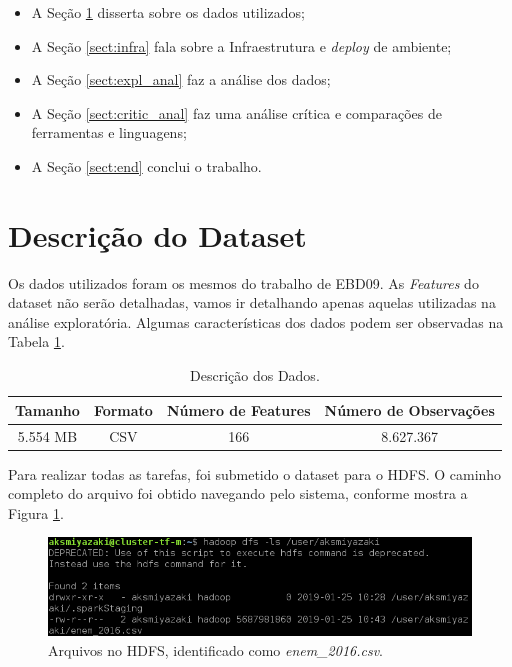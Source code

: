 \documentclass{article}
\begin{document}
\begin{itemize}
    \item A Seção \ref{sect:data} disserta sobre os dados utilizados;
    \item A Seção \ref{sect:infra} fala sobre a Infraestrutura e \emph{deploy} de ambiente;
    \item A Seção \ref{sect:expl_anal} faz a análise dos dados;
    \item A Seção \ref{sect:critic_anal} faz uma análise crítica e comparações de ferramentas e linguagens;
    \item A Seção \ref{sect:end} conclui o trabalho.
\end{itemize}

\newpage
\section{Descrição do Dataset}
\label{sect:data}

Os dados utilizados foram os mesmos do trabalho de EBD09. As \emph{Features} do dataset não serão detalhadas, vamos ir detalhando apenas aquelas utilizadas na análise exploratória. Algumas características dos dados podem ser observadas na Tabela \ref{tab:data_data}.

\begin{table}[H]
\centering
\begin{tabular}{|c|c|c|c|}
\hline
Tamanho & Formato & Número de Features &  Número de Observações \\ \hline \hline
5.554 MB & CSV & 166 & 8.627.367 \\ \hline
\end{tabular}
\caption{Descrição dos Dados.}
\label{tab:data_data}
\end{table}

Para realizar todas as tarefas, foi submetido o dataset para o HDFS. O caminho completo do arquivo foi obtido navegando pelo sistema, conforme mostra a Figura \ref{fig:data_on_hdfs}.

\begin{figure}[H]
  \includegraphics[width=\linewidth]{img/file_hdfs.png}
  \caption{Arquivos no HDFS, identificado como \emph{enem\_2016.csv}.}
  \label{fig:data_on_hdfs}
\end{figure}
\end{document}

